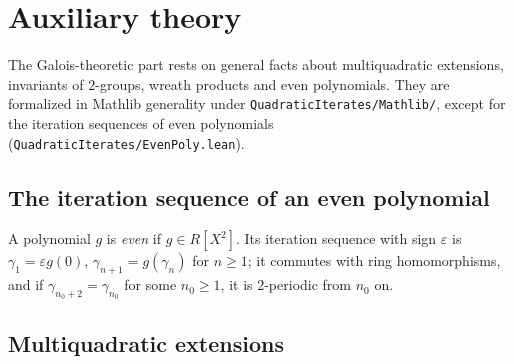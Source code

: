 \chapter{Auxiliary theory}
\label{chap:auxiliary}

The Galois-theoretic part rests on general facts about multiquadratic extensions, invariants of
$2$-groups, wreath products and even polynomials. They are formalized in Mathlib generality under
\texttt{QuadraticIterates/Mathlib/}, except for the iteration sequences of even polynomials
(\texttt{QuadraticIterates/EvenPoly.lean}).

\section{The iteration sequence of an even polynomial}

\begin{definition}
  \label{def:gammaseq}
  \leanok
  A polynomial $g$ is \emph{even} if $g \in R[X^2]$. Its iteration sequence with sign
  $\varepsilon$ is $\gamma_1 = \varepsilon g(0)$, $\gamma_{n+1} = g(\gamma_n)$ for $n \ge 1$; it
  commutes with ring homomorphisms, and if $\gamma_{n_0 + 2} = \gamma_{n_0}$ for some $n_0 \ge 1$, it
  is $2$-periodic from $n_0$ on.
\end{definition}

\section{Multiquadratic extensions}

